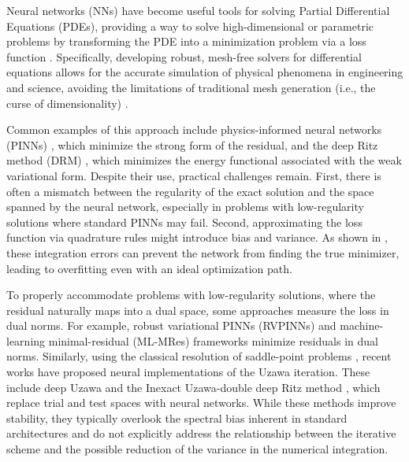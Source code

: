 \documentclass{article}
\theoremstyle{definition}
\begin{document}
Neural networks (NNs) have become useful tools for solving Partial Differential Equations (PDEs), providing a way to solve high-dimensional or parametric problems by transforming the PDE into a minimization problem via a loss function \cite{Raissi2019PINNs, EYu2018DeepRitz}. Specifically, developing robust, mesh-free solvers for differential equations allows for the accurate simulation of physical phenomena in engineering and science, avoiding the limitations of traditional mesh generation (i.e., the curse of dimensionality) \cite{han2018solving}.

Common examples of this approach include physics-informed neural networks (PINNs) \cite{Raissi2019PINNs}, which minimize the strong form of the residual, and the deep Ritz method (DRM) \cite{EYu2018DeepRitz}, which minimizes the energy functional associated with the weak variational form. Despite their use, practical challenges remain. First, there is often a mismatch between the regularity of the exact solution and the space spanned by the neural network, especially in problems with low-regularity solutions where standard PINNs may fail. Second, approximating the loss function via quadrature rules might introduce bias and variance. As shown in \cite{Rivera2022, taylor2025stochastic}, these integration errors can prevent the network from finding the true minimizer, leading to overfitting even with an ideal optimization path.

To properly accommodate problems with low-regularity solutions, where the residual naturally maps into a dual space, some approaches measure the loss in dual norms. For example, robust variational PINNs (RVPINNs) \cite{rojas2024robust} and machine-learning minimal-residual (ML-MRes) frameworks \cite{brevis2021machine} minimize residuals in dual norms. Similarly, using the classical resolution of saddle-point problems \cite{uzawa1958iterative, bacuta2006unified}, recent works have proposed neural implementations of the Uzawa iteration. These include deep Uzawa \cite{makridakis2024deep} and the Inexact Uzawa-double deep Ritz method \cite{BennyChackoBEV2025}, which replace trial and test spaces with neural networks. While these methods improve stability, they typically overlook the spectral bias inherent in standard architectures and do not explicitly address the relationship between the iterative scheme and the possible reduction of the variance in the numerical integration.
\end{document}
